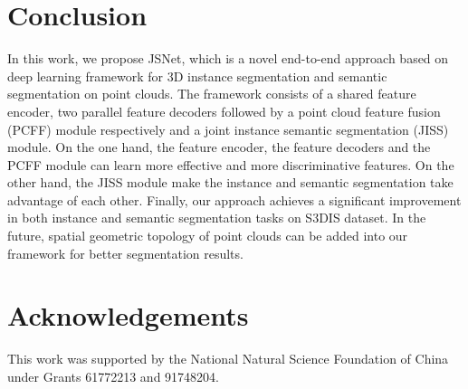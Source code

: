 \documentclass[letterpaper]{article} \usepackage{aaai20}  \usepackage{times}  \usepackage{helvet} \usepackage{courier}  \usepackage[hyphens]{url}  \usepackage{graphicx} \urlstyle{rm} \def\UrlFont{\rm}  \usepackage{graphicx}  \frenchspacing  \setlength{\pdfpagewidth}{8.5in}  \setlength{\pdfpageheight}{11in}
\begin{document}
\section{Conclusion}
In this work, we propose JSNet, which is a novel end-to-end approach based on deep learning framework for 3D instance segmentation and semantic segmentation on point clouds. The framework consists of a shared feature encoder, two parallel feature decoders followed by a point cloud feature fusion (PCFF) module respectively and a joint instance semantic segmentation (JISS) module. On the one hand, the feature encoder, the feature decoders and the PCFF module can learn more effective and more discriminative features. On the other hand, the JISS module make the instance and semantic segmentation take advantage of each other. Finally, our approach achieves a significant improvement in both instance and semantic segmentation tasks on S3DIS dataset. In the future, spatial geometric topology of point clouds can be added into our framework for better segmentation results.

\section{Acknowledgements}
This work was supported by the National Natural Science Foundation of China under Grants 61772213 and 91748204.



\end{document}
